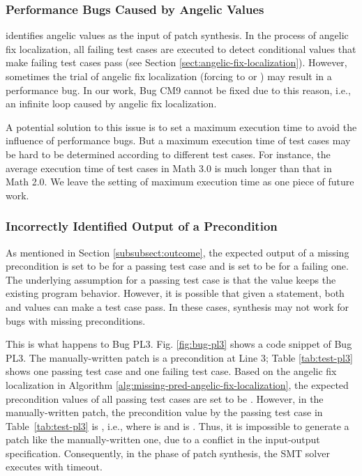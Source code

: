 \subsubsection{Performance Bugs Caused by Angelic Values}

\nopol identifies angelic values as the input of patch synthesis. In the process of angelic fix localization, all failing test cases are executed to detect conditional values that make failing test cases pass (see Section \ref{sect:angelic-fix-localization}). However, sometimes the trial of angelic fix localization (forcing to  or ) may result in a performance bug. In our work, Bug CM9 cannot be fixed due to this reason, i.e., an infinite loop caused by angelic fix localization.

A potential solution to this issue is to set a maximum execution time to avoid the influence of performance bugs. But a maximum execution time of test cases may be hard to be determined according to different test cases. For instance, the average execution time of test cases in Math 3.0 is much longer than that in Math 2.0. We leave the setting of maximum execution time as one piece of future work. 

\subsubsection{Incorrectly Identified Output of a Precondition}
\label{subsubsect:limit-pl3}

As mentioned in Section \ref{subsubsect:outcome}, the expected output of a missing precondition is set to be  for a passing test case and is set to be  for a failing one. The underlying assumption for a passing test case is that the  value keeps the existing program behavior. However, it is possible that given a statement, both  and  values can make a test case pass. 
In these cases, synthesis may not work for bugs with missing preconditions.

This is what happens to Bug PL3. Fig. \ref{fig:bug-pl3} shows a code snippet of Bug PL3. The manually-written patch is a precondition at Line 3; Table \ref{tab:test-pl3} shows one passing test case and one failing test case. 
Based on the angelic fix localization in Algorithm \ref{alg:missing-pred-angelic-fix-localization}, the expected precondition values of all passing test cases are set to be . However, in the manually-written patch, the precondition value by the passing test case in Table~\ref{tab:test-pl3} is , i.e.,  where  is  and  is . 
Thus, it is impossible to generate a patch like the manually-written one, due to a conflict in the input-output specification. Consequently, in the phase of patch synthesis, the SMT solver executes with timeout. 

